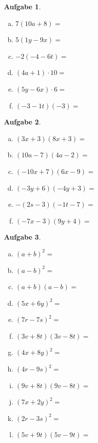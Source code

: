 \documentclass[12pt,fleqn]{article}
\theoremstyle{aufg}
\newtheorem{aufgabe}{Aufgabe}
\theoremstyle{bsp}
\begin{document}
\begin{flushleft}
\begin{aufgabe} ~ \\ 
\begin{multicols}{3} 
\begin{enumerate}[a)] 
\item 
$7(10a+8)=$
\item 
$5(1y-9x)=$
\item 
$-2(-4-6t)=$
\item 
$(4a+1)\cdot 10=$
\item 
$(5y-6x)\cdot 6=$
\item 
$(-3-1t)(-3)=$
\end{enumerate} 
\end{multicols} 
\end{aufgabe} 
\begin{aufgabe} ~ \\ 
\begin{multicols}{3} 
\begin{enumerate}[a)] 
\item 
$(3x+3)(8x+3)=$
\item 
$(10a-7)(4a-2)=$
\item 
$(-10x+7)(6x-9)=$
\item 
$(-3y+6)(-4y+3)=$
\item 
$-(2s-3)(-1t-7)=$
\item 
$(-7x-3)(9y+4)=$
\end{enumerate} 
\end{multicols} 
\end{aufgabe} 
\begin{aufgabe} ~ \\ 
\begin{multicols}{3} 
\begin{enumerate}[a)] 
\item 
$(a+b)^2=$
\item 
$(a-b)^2=$
\item 
$(a+b)(a-b)=$
\item 
$(5x+6y)^2=$
\item 
$(7r-7s)^2=$
\item 
$(3v+8t)(3v-8t)=$
\item 
$(4x+8y)^2=$
\item 
$(4r-9s)^2=$
\item 
$(9v+8t)(9v-8t)=$
\item 
$(7x+2y)^2=$
\item 
$(2r-3s)^2=$
\item 
$(5v+9t)(5v-9t)=$
\end{enumerate} 
\end{multicols} 
\end{aufgabe} 
\end{flushleft} 
\end{document}
